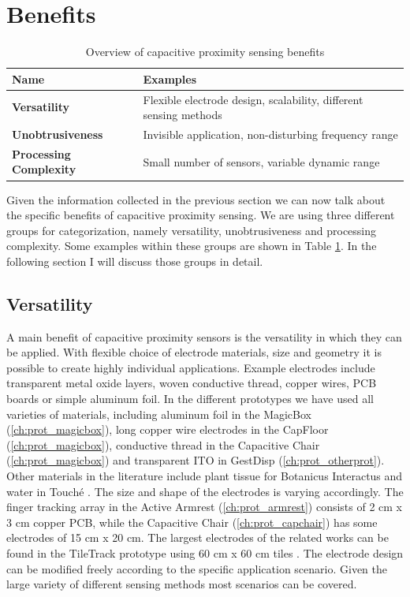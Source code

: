 \section{Benefits}
\begin{table}[htbp]
  \centering
  \caption{Overview of capacitive proximity sensing benefits}
    \begin{tabular}{p{4cm}p{6cm}}
    \toprule
    \textbf{Name} & \textbf{Examples} \\
    \midrule
    \textbf{Versatility} & Flexible electrode design, scalability, different sensing methods \\
    \textbf{Unobtrusiveness} & Invisible application, non-disturbing frequency range \\
    \textbf{Processing Complexity} & Small number of sensors, variable dynamic range \\
    \bottomrule
    \end{tabular}%
  \label{tab:cap_benefits}%
\end{table}%

Given the information collected in the previous section we can now talk about the specific benefits of capacitive proximity sensing. We are using three different groups for categorization, namely versatility, unobtrusiveness and processing complexity. Some examples within these groups are shown in Table \ref{tab:cap_benefits}. In the following section I will discuss those groups in detail.
\subsection{Versatility}
A main benefit of capacitive proximity sensors is the versatility in which they can be applied. With flexible choice of electrode materials, size and geometry it is possible to create highly individual applications. Example electrodes include transparent metal oxide layers, woven conductive thread, copper wires, PCB boards or simple aluminum foil. In the different prototypes we have used all varieties of materials, including aluminum foil in the MagicBox (\ref{ch:prot_magicbox}), long copper wire electrodes in the CapFloor (\ref{ch:prot_magicbox}), conductive thread in the Capacitive Chair (\ref{ch:prot_magicbox}) and transparent ITO in GestDisp (\ref{ch:prot_otherprot}). Other materials in the literature include plant tissue for Botanicus Interactus \cite{poupyrev2012botanicus} and water in Touché \cite{Sato2012}. The size and shape of the electrodes is varying accordingly. The finger tracking array in the Active Armrest (\ref{ch:prot_armrest}) consists of 2 cm x 3 cm copper PCB, while the Capacitive  Chair (\ref{ch:prot_capchair}) has some electrodes of 15 cm x 20 cm. The largest electrodes of the related works can be found in the TileTrack prototype using 60 cm x 60 cm tiles \cite{valtonen2010human}. The electrode design can be modified freely according to the specific application scenario. Given the large variety of different sensing methods most scenarios can be covered.

